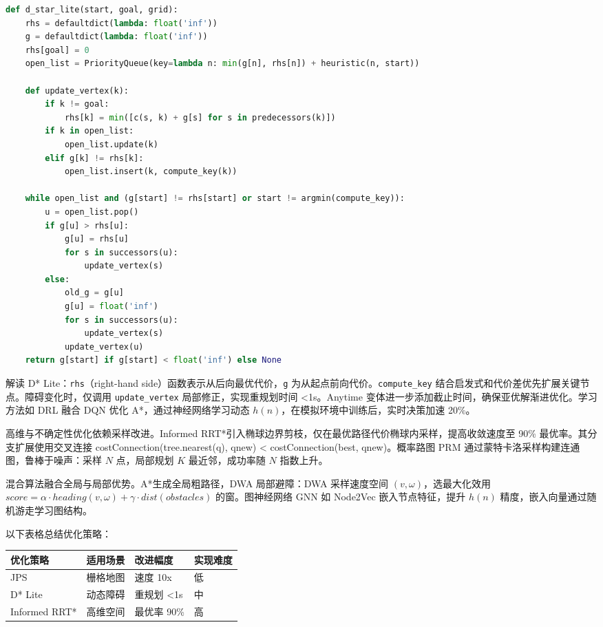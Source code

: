 \begin{lstlisting}[language=python]
def d_star_lite(start, goal, grid):
    rhs = defaultdict(lambda: float('inf'))
    g = defaultdict(lambda: float('inf'))
    rhs[goal] = 0
    open_list = PriorityQueue(key=lambda n: min(g[n], rhs[n]) + heuristic(n, start))
    
    def update_vertex(k):
        if k != goal:
            rhs[k] = min([c(s, k) + g[s] for s in predecessors(k)])
        if k in open_list:
            open_list.update(k)
        elif g[k] != rhs[k]:
            open_list.insert(k, compute_key(k))
    
    while open_list and (g[start] != rhs[start] or start != argmin(compute_key)):
        u = open_list.pop()
        if g[u] > rhs[u]:
            g[u] = rhs[u]
            for s in successors(u):
                update_vertex(s)
        else:
            old_g = g[u]
            g[u] = float('inf')
            for s in successors(u):
                update_vertex(s)
            update_vertex(u)
    return g[start] if g[start] < float('inf') else None
\end{lstlisting}
解读 D* Lite：\texttt{rhs}（right-hand side）函数表示从后向最优代价，\texttt{g} 为从起点前向代价。\texttt{compute\_{}key} 结合启发式和代价差优先扩展关键节点。障碍变化时，仅调用 \texttt{update\_{}vertex} 局部修正，实现重规划时间 <1s。Anytime 变体进一步添加截止时间，确保亚优解渐进优化。学习方法如 DRL 融合 DQN 优化 A*，通过神经网络学习动态 $h(n)$，在模拟环境中训练后，实时决策加速 20\%{}。\par
高维与不确定性优化依赖采样改进。Informed RRT*引入椭球边界剪枝，仅在最优路径代价椭球内采样，提高收敛速度至 90\%{} 最优率。其分支扩展使用交叉连接 costConnection(tree.nearest(q), qnew) < costConnection(best, qnew)。概率路图 PRM 通过蒙特卡洛采样构建连通图，鲁棒于噪声：采样 $N$ 点，局部规划 $K$ 最近邻，成功率随 $N$ 指数上升。\par
混合算法融合全局与局部优势。A*生成全局粗路径，DWA 局部避障：DWA 采样速度空间 $(v, \omega)$，选最大化效用 $score = \alpha \cdot heading(v, \omega) + \gamma \cdot dist(obstacles)$ 的窗。图神经网络 GNN 如 Node2Vec 嵌入节点特征，提升 $h(n)$ 精度，嵌入向量通过随机游走学习图结构。\par
以下表格总结优化策略：\par
\begin{table}[H]
\centering
\begin{tabular}{|l|l|l|l|}
\hline
优化策略 & 适用场景 & 改进幅度 & 实现难度 \\
\hline
JPS & 栅格地图 & 速度 10x & 低 \\
\hline
D* Lite & 动态障碍 & 重规划 <1s & 中 \\
\hline
Informed RRT* & 高维空间 & 最优率 90\%{} & 高 \\
\hline
\end{tabular}
\end{table}

